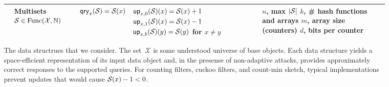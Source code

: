 \begin{figure*}[tp]
\begin{center}
\begin{tabular}{ |p{1.75cm} | p{2.5cm} | p{2.95cm} | p{4cm} | p{3.7cm}|}
          & \parbox[c]{2.5cm}{Multisets\\ $\mathcal{S} \in \mathrm{Func}(\mathcal{X},\mathbb{N})$}
          & $\mathsf{qry}_x(\mathcal{S}) = \mathcal{S}(x)$
          & \parbox[c][10ex]{4cm}{$\mathsf{up}_{x,0}(\mathcal{S})(x) = \mathcal{S}(x)+1$ \\ $\mathsf{up}_{x,1}(\mathcal{S})(x) = \mathcal{S}(x)-1$ \\ $\mathsf{up}_{x,b}(\mathcal{S})(y) = \mathcal{S}(y)$ for $x \neq y$}
          & \parbox[c]{3.75cm}{$n$, max $|\mathcal{S}|$\\$k$, \# hash functions and arrays\\$m$, array size (counters)\\$d$, bits per counter}
          \\ \hline
  \end{tabular}
\caption{The data structrues that we consider.  The set~$\mathcal{X}$ is some understood universe of base objects.  Each data structure yields a space-efficient representation of its input data object and, in the presense of non-adaptive attacks, provides approximately correct responses to the supported queries.  For counting filters, cuckoo filters, and count-min sketch, typical implementations prevent updates that would cause $\mathcal{S}(x)-1 < 0$.}
\end{center}
\end{figure*}